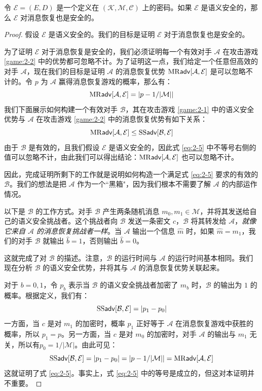 \begin{theorem}\label{theo:2-7}
令 $\mathcal{E}=(E,D)$ 是一个定义在 $(\mathcal{K},\mathcal{M},\mathcal{C})$ 上的密码。如果 $\mathcal{E}$ 是语义安全的，那么 $\mathcal{E}$ 对消息恢复也是安全的。
\end{theorem}

\begin{proof}
假设 $\mathcal{E}$ 是语义安全的。我们的目标是证明 $\mathcal{E}$ 对于消息恢复也是安全的。

为了证明 $\mathcal{E}$ 对于消息恢复是安全的，我们必须证明每一个有效对手 $\mathcal{A}$ 在攻击游戏 \ref{game:2-2} 中的优势都可忽略不计。为了证明这一点，我们给定一个任意但高效的对手 $\mathcal{A}$，现在我们的目标是证明 $\mathcal{A}$ 的消息恢复优势 ${\rm MR\mathsf{adv}}[\mathcal{A},\mathcal{E}]$ 是可以忽略不计的。令 $p$ 为 $\mathcal{A}$ 赢得消息恢复游戏的概率，那么有：
$$
{\rm MR\mathsf{adv}}[\mathcal{A},\mathcal{E}]=\left|p-{1}/{|\mathcal{M}|}\right|
$$
我们下面展示如何构建一个有效对手 $\mathcal{B}$，其在攻击游戏 \ref{game:2-1} 中的语义安全优势与 $\mathcal{A}$ 在攻击游戏 \ref{game:2-2} 中的消息恢复优势有如下关系：
\begin{equation}\label{eq:2-5}
{\rm MR\mathsf{adv}}[\mathcal{A},\mathcal{E}]\leq{\rm SS\mathsf{adv}}[\mathcal{B},\mathcal{E}]
\end{equation}
由于 $\mathcal{B}$ 是有效的，且我们假设 $\mathcal{E}$ 是语义安全的，因此式 \ref{eq:2-5} 中不等号右侧的值可以忽略不计，由此我们可以得出结论：${\rm MR\mathsf{adv}}[\mathcal{A},\mathcal{E}]$ 也可以忽略不计。

因此，完成证明所剩下的工作就是说明如何构造一个满足式 \ref{eq:2-5} 要求的有效的 $\mathcal{B}$。我们的想法是把 $\mathcal{A}$ 作为一个``黑箱"，因为我们根本不需要了解 $\mathcal{A}$ 的内部运作情况。

以下是 $\mathcal{B}$ 的工作方式。对手 $\mathcal{B}$ 产生两条随机消息 $m_0,m_1\in\mathcal{M}$，并将其发送给自己的语义安全挑战者。这个挑战者向 $\mathcal{B}$ 发送一条密文 $c$，$\mathcal{B}$ 将其转发给 $\mathcal{A}$，\emph{就像它来自 $\mathcal{A}$ 的消息恢复挑战者一样}。当 $\mathcal{A}$ 输出一个信息 $\hat m$ 时，如果 $\hat m=m_1$，我们的对手 $\mathcal{B}$ 就输出 $\hat b=1$，否则输出 $\hat b=0$。

这就完成了对 $\mathcal{B}$ 的描述。注意，$\mathcal{B}$ 的运行时间与 $\mathcal{A}$ 的运行时间基本相同。我们现在分析 $\mathcal{B}$ 的语义安全优势，并将其与 $\mathcal{A}$ 的消息恢复优势关联起来。

对于 $b=0,1$，令 $p_b$ 表示当 $\mathcal{B}$ 的语义安全挑战者加密了 $m_b$ 时，$\mathcal{B}$ 的输出为 $1$ 的概率。根据定义，我们有：
$$
{\rm SS\mathsf{adv}}[\mathcal{B},\mathcal{E}]=|p_1-p_0|
$$
一方面，当 $c$ 是对 $m_1$ 的加密时，概率 $p_1$ 正好等于 $\mathcal{A}$ 在消息恢复游戏中获胜的概率，所以 $p_1=p$。另一方面，当 $c$ 是对 $m_0$ 的加密时，对手 $\mathcal{A}$ 的输出与 $m_1$ 无关，所以有$p_0={1}/{|\mathcal M|}$。由此可见：
$$
{\rm SS\mathsf{adv}}[\mathcal{B},\mathcal{E}]=|p_1-p_0|=|p-{1}/{|\mathcal{M}|}|={\rm MR\mathsf{adv}}[\mathcal{A},\mathcal{E}]
$$
这就证明了式 \ref{eq:2-5}。事实上，式 \ref{eq:2-5} 中的等号是成立的，但这对本证明并不重要。
\end{proof}

